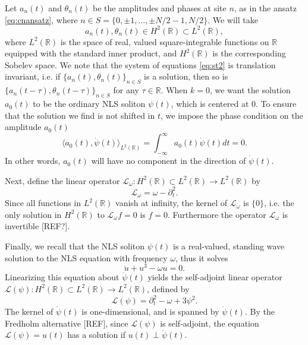 \documentclass[11pt,reqno]{amsart}
\def\R{{\mathbb R}}
\def\calL{{\mathcal L}}
\def\Lw{{\mathcal{L}_\omega}}
\begin{document}
Let $a_n(t)$ and $\theta_n(t)$ be the amplitudes and phases at site $n$, as in the ansatz \cref{eq:cnansatz}, where $n \in S = \{ 0, \pm 1, \dots, \pm N/2-1, N/2 \}$. We will take 
\[
a_n(t), \theta_n(t) \in H^2(\R) \subset L^2(\R),
\]
where $L^2(\R)$ is the space of real, valued square-integrable functions on $\R$ equipped with the standard inner product, and $H^2(\R)$ is the corresponding Sobelev space. We note that the system of equations \cref{eq:st2} is translation invariant, i.e. if $\{ a_n(t), \theta_n(t)\}_{n\in S}$ is a solution, then so is $\{ a_n(t-\tau), \theta_n(t-\tau)\}_{n\in S}$ for any $\tau \in \R$. When $k = 0$, we want the solution $a_0(t)$ to be the ordinary NLS soliton $\psi(t)$, which is centered at 0. To ensure that the solution we find is not shifted in $t$, we impose the phase condition on the amplitude $a_0(t)$
\begin{equation}\label{eq:phasecond}
\langle a_0(t), \dot{\psi}(t) \rangle_{L^2(\R)} = \int_{-\infty}^\infty a_0(t) \dot{\psi}(t) dt = 0.
\end{equation}
In other words, $a_0(t)$ will have no component in the direction of $\dot{\psi}(t)$.

Next, define the linear operator $\Lw: H^2(\R) \subset L^2(\R) \rightarrow L^2(\R)$ by
\begin{equation}\label{eq:Lw}
\Lw = \omega - \partial_t^2.
\end{equation}
Since all functions in $L^2(\R)$ vanish at infinity, the kernel of $\Lw$ is $\{0\}$, i.e. the only solution in $H^2(\R)$ to $\Lw f = 0$ is $f = 0$. Furthermore the operator $\Lw$ is invertible [REF?].

Finally, we recall that the NLS soliton $\psi(t)$ is a real-valued, standing wave solution to the NLS equation with frequency $\omega$, thus it solves 
\begin{equation}\label{eq:NLSreal}
\ddot{u} + u^3 - \omega u = 0. 
\end{equation}
Linearizing this equation about $\dot{\psi}(t)$ yields the self-adjoint linear operator $\calL(\psi): H^2(\R) \subset L^2(\R) \rightarrow L^2(\R)$, defined by
\begin{equation}\label{eq:Lpsi}
\calL(\psi) = \partial_t^2 - \omega + 3 \psi^2.
\end{equation}
The kernel of $\dot{\psi}(t)$ is one-dimensional, and is spanned by $\dot{\psi}(t)$. By the Fredholm alternative [REF], since $\calL(\psi)$ is self-adjoint, the equation $\calL(\psi) = u(t)$ has a solution if $u(t) \perp \dot{\psi}(t)$.
\end{document}
